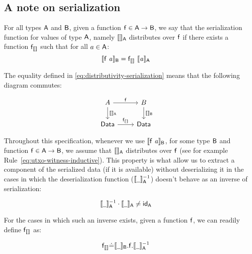 \subsection{A note on serialization}
\label{sec:a-note-on-serialization}

\begin{definition}
  For all types $\mathsf{A}$ and $\mathsf{B}$, given a function
  $\mathsf{f} \in \mathsf{A} \to \mathsf{B}$, we say that the serialization function
  for values of type $\mathsf{A}$, namely $\llbracket \mathit{ } \rrbracket_{\mathsf{A}}$ distributes
  over $\mathsf{f}$ if there exists a function $\mathsf{f}_{\llbracket \mathit{ } \rrbracket}$ such
  that for all $a \in \mathsf{A}$:
  \begin{equation}
    \label{eq:distributivity-serialization}
    \llbracket \mathit{\mathsf{f}~a} \rrbracket_{\mathsf{B}} = \mathsf{f}_{\llbracket \mathit{ } \rrbracket}~\llbracket \mathit{a} \rrbracket_{\mathsf{A}}
  \end{equation}
\end{definition}
The equality defined in \cref{eq:distributivity-serialization} means that the
following diagram commutes:

\[
  \begin{tikzcd}
    A \arrow{r}{\fun{f}} \arrow{d}{\serialised{ }_\type{A}}
    & B \arrow{d}{\serialised{ }_\type{B}} \\
    \Data \arrow{r}{\fun{f}_{\serialised{ }}} & \Data
  \end{tikzcd}
\]

Throughout this specification, whenever we use
$\llbracket \mathit{\mathsf{f}~a} \rrbracket_{\mathsf{B}}$, for some type $\mathsf{B}$ and function
$\mathsf{f} \in \mathsf{A} \to \mathsf{B}$, we assume that $\llbracket \mathit{ } \rrbracket_{\mathsf{A}}$
distributes over $\mathsf{f}$ (see for example
Rule~\ref{eq:utxo-witness-inductive}). This property is what allow us to
extract a component of the serialized data (if it is available) without
deserializing it in the cases in which the deserialization function
($\serialised{\wcard}^{-1}_\type{A}$) doesn't behave as an inverse of
serialization:

\begin{equation*}
  \serialised{\wcard}^{-1}_\type{A} \cdot \serialised{\wcard}_\type{A} \neq \fun{id}_\type{A}
\end{equation*}

For the cases in which such an inverse exists, given a function $\mathsf{f}$, we
can readily define $\mathsf{f}_{\llbracket \mathit{ } \rrbracket}$ as:

\begin{equation*}
  \fun{f}_{\serialised{ }} \dot{=} \serialised{\wcard}_\type{B}
                            . \fun{f}
                            . \serialised{\wcard}^{-1}_\type{A}
\end{equation*}
